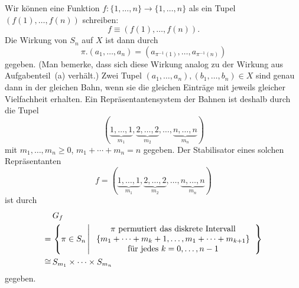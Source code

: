 Wir können eine Funktion $f \colon \{1, \dotsc, n\} \to \{1, \dotsc, n\}$ als ein Tupel $(f(1), \dotsc, f(n))$ schreiben:
\[
          f
  \equiv  (f(1), \dotsc, f(n)).
\]
Die Wirkung von $S_n$ auf $X$ ist dann durch
\[
    \pi.(a_1, \dotsc, a_n)
  = \left( a_{\pi^{-1}(1)}, \dotsc, a_{\pi^{-1}(n)} \right)
\]
gegeben.
(Man bemerke, dass sich diese Wirkung analog zu der Wirkung aus Aufgabenteil~(a) verhält.)
Zwei Tupel $(a_1, \dotsc, a_n), (b_1, \dotsc, b_n) \in X$ sind genau dann in der gleichen Bahn, wenn sie die gleichen Einträge mit jeweils gleicher Vielfachheit erhalten.
Ein Repräsentantensystem der Bahnen ist deshalb durch die Tupel
\[
  ( \underbrace{1, \dotsc, 1}_{m_1},
    \underbrace{2, \dotsc, 2}_{m_2},
    \dotsc,
    \underbrace{n, \dotsc, n}_{m_n} )
\]
mit $m_1, \dotsc, m_n \geq 0$, $m_1 + \dotsb + m_n = n$ gegeben.
Der Stabilisator eines solchen Repräsentanten
\[
  f = ( \underbrace{1, \dotsc, 1}_{m_1},
        \underbrace{2, \dotsc, 2}_{m_2},
        \dotsc,
        \underbrace{n, \dotsc, n}_{m_n} )
\]
ist durch
\begin{align*}
   &\,      G_f
  \\
  =&\,      \left\{
              \pi \in S_n
            \suchthat*
              \begin{tabular}{c}
                $\pi$ permutiert das diskrete Intervall \\
                $\{m_1 + \dotsb + m_k + 1, \dotsc, m_1 + \dotsb + m_{k+1}\}$  \\
                für jedes $k = 0, \dotsc, n-1$
              \end{tabular}
            \right\}
  \\
  \cong&\,  S_{m_1} \times \dotsb \times S_{m_n}
\end{align*}
gegeben.




